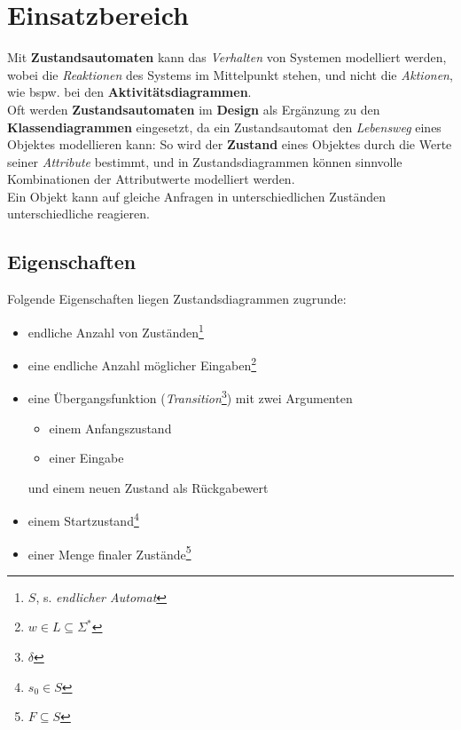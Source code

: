 \section{Einsatzbereich}

Mit \textbf{Zustandsautomaten} kann das \textit{Verhalten} von Systemen modelliert werden, wobei die \textit{Reaktionen} des Systems im Mittelpunkt stehen, und nicht die \textit{Aktionen}, wie bspw. bei den \textbf{Aktivitätsdiagrammen}.\\

\noindent
Oft werden \textbf{Zustandsautomaten} im \textbf{Design} als Ergänzung zu den \textbf{Klassendiagrammen} eingesetzt, da ein Zustandsautomat den \textit{Lebensweg} eines Objektes modellieren kann: So wird der \textbf{Zustand} eines Objektes durch die Werte seiner \textit{Attribute} bestimmt, und in Zustandsdiagrammen können sinnvolle Kombinationen der Attributwerte modelliert werden.\\
Ein Objekt kann auf gleiche Anfragen in unterschiedlichen Zuständen unterschiedliche reagieren.\\

\subsection*{Eigenschaften}

Folgende Eigenschaften liegen Zustandsdiagrammen zugrunde:

\begin{itemize}
    \item endliche Anzahl von Zuständen\footnote{$S$, s. \textit{endlicher Automat}}
    \item eine endliche Anzahl möglicher Eingaben\footnote{$w \in L \subseteq \Sigma^*$}
    \item eine Übergangsfunktion (\textit{Transition}\footnote{$\delta$}) mit zwei Argumenten
    \begin{itemize}
        \item einem Anfangszustand
        \item einer Eingabe
    \end{itemize}
    \noindent
    und einem neuen Zustand als Rückgabewert
    \item einem Startzustand\footnote{$s_0 \in S$}
    \item einer Menge finaler Zustände\footnote{$F \subseteq S$}
\end{itemize}